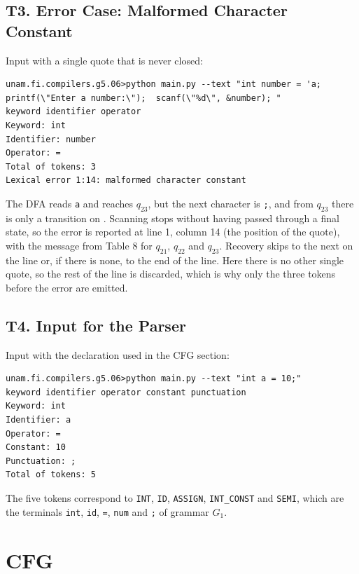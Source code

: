 \documentclass[12pt,letterpaper]{article}
\newcommand{\cd}[1]{\texttt{#1}}                       %
\begin{document}
\subsection{T3. Error Case: Malformed Character Constant}

Input with a single quote that is never closed:

\begin{lstlisting}
unam.fi.compilers.g5.06>python main.py --text "int number = 'a; printf(\"Enter a number:\");  scanf(\"%d\", &number); "
keyword identifier operator
Keyword: int
Identifier: number
Operator: =
Total of tokens: 3
Lexical error 1:14: malformed character constant
\end{lstlisting}

The DFA reads \cd{\textquotesingle a} and reaches $q_{23}$, but the next character is \cd{;}, and from $q_{23}$ there is only a transition on \cd{\textquotesingle}. Scanning stops without having passed through a final state, so the error is reported at line 1, column 14 (the position of the quote), with the message from Table 8 for $q_{21}$, $q_{22}$ and $q_{23}$. Recovery skips to the next \cd{\textquotesingle} on the line or, if there is none, to the end of the line. Here there is no other single quote, so the rest of the line is discarded, which is why only the three tokens before the error are emitted.

\subsection{T4. Input for the Parser}

Input with the declaration used in the CFG section:

\begin{lstlisting}
unam.fi.compilers.g5.06>python main.py --text "int a = 10;"
keyword identifier operator constant punctuation
Keyword: int
Identifier: a
Operator: =
Constant: 10
Punctuation: ;
Total of tokens: 5
\end{lstlisting}

The five tokens correspond to \cd{INT}, \cd{ID}, \cd{ASSIGN}, \cd{INT\_CONST} and \cd{SEMI}, which are the terminals \cd{int}, \cd{id}, \cd{=}, \cd{num} and \cd{;} of grammar $G_1$.

\section{CFG}
\end{document}
